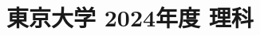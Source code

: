 ﻿\documentclass[../../uem_mat_tok_q.tex]{subfiles}
\begin{document}
    \section{東京大学 2024年度 理科}
    \subsection{　}
    
    \vfill
    \subsection{　}
    
    \vfill
    \newpage
    \subsection{　}
    
    \vfill
    \subsection{　}
    
    \vfill
    \newpage
    \subsection{　}
    
    \vfill
    \subsection{　}
    
    \vfill
\end{document}
